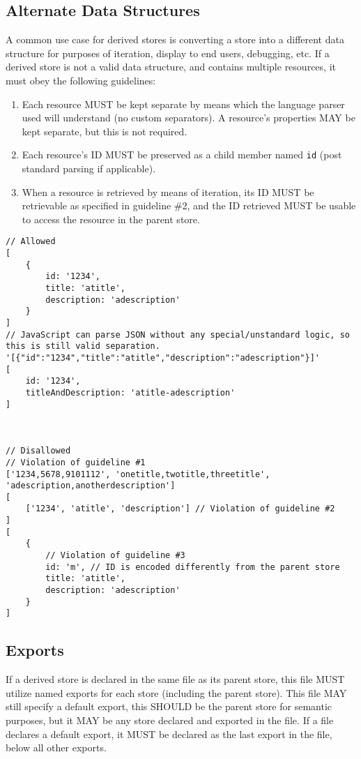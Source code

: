 \documentclass{article}
\begin{document}
\subsection{Alternate Data Structures}
A common use case for derived stores is converting a store into a different data structure for purposes of iteration, display to end users, debugging, etc. If a derived store is not a valid data structure, and contains multiple resources, it must obey the following guidelines:
\begin{enumerate}
    \item Each resource MUST be kept separate by means which the language parser used will understand (no custom separators). A resource's properties MAY be kept separate, but this is not required.
    \item Each resource's ID MUST be preserved as a child member named \verb|id| (post standard parsing if applicable).
    \item When a resource is retrieved by means of iteration, its ID MUST be retrievable as specified in guideline \#2, and the ID retrieved MUST be usable to access the resource in the parent store.
\end{enumerate}

\begin{lstlisting}[caption=Derived Store as Array]
// Allowed
[
    {
        id: '1234',
        title: 'atitle',
        description: 'adescription'
    }
]
// JavaScript can parse JSON without any special/unstandard logic, so this is still valid separation.
'[{"id":"1234","title":"atitle","description":"adescription"}]'
[
    id: '1234',
    titleAndDescription: 'atitle-adescription'
]



// Disallowed
// Violation of guideline #1
['1234,5678,9101112', 'onetitle,twotitle,threetitle', 'adescription,anotherdescription']
[
    ['1234', 'atitle', 'description'] // Violation of guideline #2
]
[
    {
        // Violation of guideline #3
        id: 'm', // ID is encoded differently from the parent store
        title: 'atitle',
        description: 'adescription'
    }
]
\end{lstlisting}

\subsection{Exports}
If a derived store is declared in the same file as its parent store, this file MUST utilize named exports for each store (including the parent store). This file MAY still specify a default export, this SHOULD be the parent store for semantic purposes, but it MAY be any store declared and exported in the file. If a file declares a default export, it MUST be declared as the last export in the file, below all other exports.
\end{document}
